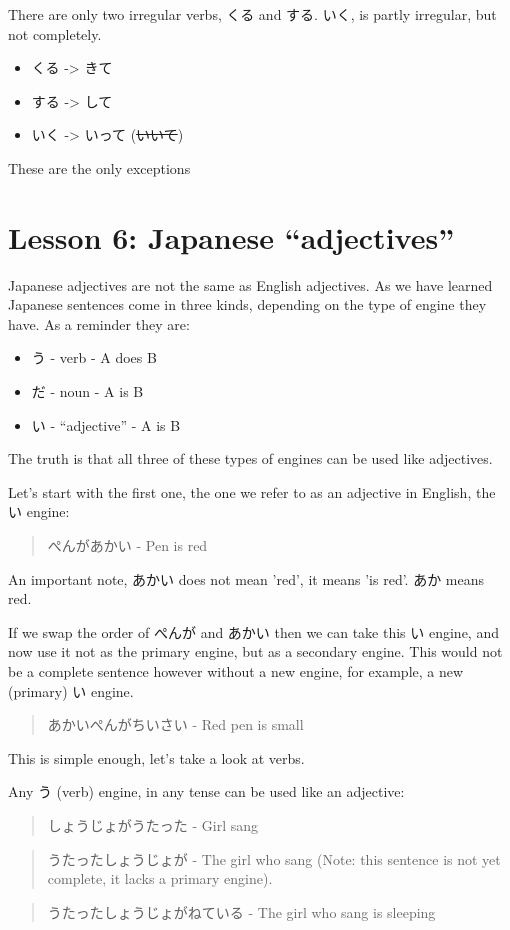 \documentclass[11pt]{article}
\begin{document}
There are only two irregular verbs, くる and する. いく, is partly irregular, but not completely.
\begin{itemize}
\item くる -> きて
\item する -> して
\item いく -> いって (\sout{いいて})
\end{itemize}
These are the only exceptions
\section{Lesson 6: Japanese ``adjectives''}
\label{sec:orge863488}
Japanese adjectives are not the same as English adjectives. As we have learned Japanese sentences come in three kinds, depending on the type of engine they have. As a reminder they are:
\begin{itemize}
\item う - verb - A does B
\item だ - noun - A is B
\item い - ``adjective'' - A is B
\end{itemize}

The truth is that all three of these types of engines can be used like adjectives.

Let's start with the first one, the one we refer to as an adjective in English, the い engine:
\begin{quote}
ぺんがあかい - Pen is red
\end{quote}
An important note, あかい does not mean 'red', it means 'is red'. あか means red.

If we swap the order of ぺんが and あかい then we can take this い engine, and now use it not as the primary engine, but as a secondary engine. This would not be a complete sentence however without a new engine, for example, a new (primary) い engine.
\begin{quote}
あかいぺんがちいさい - Red pen is small
\end{quote}
This is simple enough, let's take a look at verbs.

Any う (verb) engine, in any tense can be used like an adjective:
\begin{quote}
しょうじょがうたった - Girl sang
\end{quote}
\begin{quote}
うたったしょうじょが - The girl who sang (Note: this sentence is not yet complete, it lacks a primary engine).
\end{quote}
\begin{quote}
うたったしょうじょがねている - The girl who sang is sleeping
\end{quote}
\end{document}
